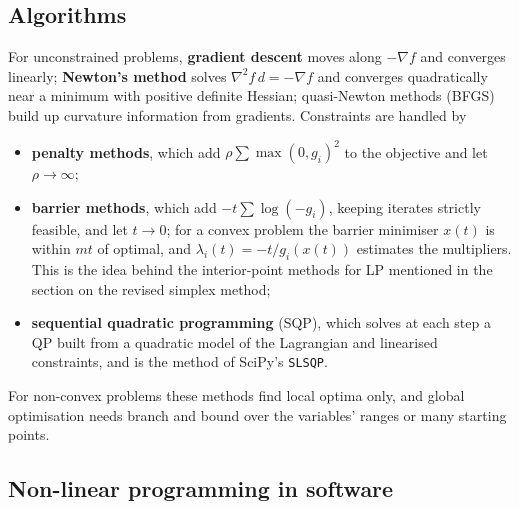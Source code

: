 \documentclass[11pt,a4paper]{article}
\numberwithin{equation}{section}
\theoremstyle{definition}
\begin{document}
\subsection{Algorithms}
\label{ssec:nlpalgorithms}

For unconstrained problems, \textbf{gradient descent} moves along $-\nabla f$ and converges linearly; \textbf{Newton's method} solves $\nabla^2f\,d = -\nabla f$ and converges quadratically near a minimum with positive definite Hessian; quasi-Newton methods (BFGS) build up curvature information from gradients. Constraints are handled by
\begin{itemize}
\item \textbf{penalty methods}, which add $\rho\sum\max(0, g_i)^2$ to the objective and let $\rho \to \infty$;
\item \textbf{barrier methods}, which add $-t\sum\log(-g_i)$, keeping iterates strictly feasible, and let $t \to 0$; for a convex problem the barrier minimiser $x(t)$ is within $mt$ of optimal, and $\lambda_i(t) = -t/g_i(x(t))$ estimates the multipliers. This is the idea behind the interior-point methods for LP mentioned in the section on the revised simplex method;
\item \textbf{sequential quadratic programming} (SQP), which solves at each step a QP built from a quadratic model of the Lagrangian and linearised constraints, and is the method of SciPy's \texttt{SLSQP}.
\end{itemize}
For non-convex problems these methods find local optima only, and global optimisation needs branch and bound over the variables' ranges or many starting points.

\subsection{Non-linear programming in software}
\label{ssec:software10}
\end{document}
